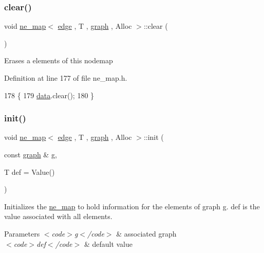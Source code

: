 \subsubsection{\texorpdfstring{clear()}{clear()}}
{\footnotesize\ttfamily void \mbox{\hyperlink{classne__map}{ne\+\_\+map}}$<$ \mbox{\hyperlink{classedge}{edge}} , T , \mbox{\hyperlink{classgraph}{graph}} , Alloc $>$\+::clear (\begin{DoxyParamCaption}{ }\end{DoxyParamCaption})\hspace{0.3cm}{\ttfamily [inherited]}}

Erases a elements of this nodemap 

Definition at line 177 of file ne\+\_\+map.\+h.


\begin{DoxyCode}
178 \{
179     \mbox{\hyperlink{classne__map_af73307678e05a9c24c084d98b267afa8}{data}}.clear();
180 \}
\end{DoxyCode}
\mbox{\label{classne__map_a4ef2ab4aebcb57a7a101975bf6a88e24}} 
\subsubsection{\texorpdfstring{init()}{init()}}
{\footnotesize\ttfamily void \mbox{\hyperlink{classne__map}{ne\+\_\+map}}$<$ \mbox{\hyperlink{classedge}{edge}} , T , \mbox{\hyperlink{classgraph}{graph}} , Alloc $>$\+::init (\begin{DoxyParamCaption}\item[{const \mbox{\hyperlink{classgraph}{graph}}  \&}]{g,  }\item[{T}]{def = {\ttfamily Value()} }\end{DoxyParamCaption})\hspace{0.3cm}{\ttfamily [inherited]}}

Initializes the \mbox{\hyperlink{classne__map}{ne\+\_\+map}} to hold information for the elements of graph g. def is the value associated with all elements.


\begin{DoxyParams}{Parameters}
{\em $<$code$>$g$<$/code$>$} & associated {\ttfamily graph} \\
\hline
{\em $<$code$>$def$<$/code$>$} & default value \\
\hline
\end{DoxyParams}


